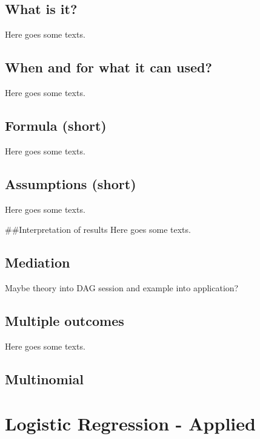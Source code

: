 \documentclass[
]{book}
\begin{document}
\hypertarget{what-is-it-1}{%
\section{What is it?}\label{what-is-it-1}}

Here goes some texts.

\hypertarget{when-and-for-what-it-can-used-1}{%
\section{When and for what it can used?}\label{when-and-for-what-it-can-used-1}}

Here goes some texts.

\hypertarget{formula-short-1}{%
\section{Formula (short)}\label{formula-short-1}}

Here goes some texts.

\hypertarget{assumptions-short-1}{%
\section{Assumptions (short)}\label{assumptions-short-1}}

Here goes some texts.

\#\#Interpretation of results
Here goes some texts.

\hypertarget{mediation-2}{%
\section{Mediation}\label{mediation-2}}

Maybe theory into DAG session and example into application?

\hypertarget{multiple-outcomes-1}{%
\section{Multiple outcomes}\label{multiple-outcomes-1}}

Here goes some texts.

\hypertarget{multinomial}{%
\section{Multinomial}\label{multinomial}}

\hypertarget{log-a}{%
\chapter{Logistic Regression - Applied}\label{log-a}}
\end{document}
